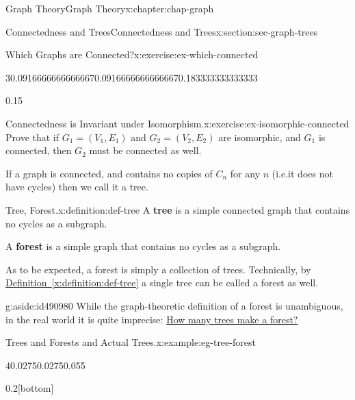 \documentclass[oneside,10pt,]{book}
\newcommand{\xreffont}{\relax}
\newcommand{\terminology}[1]{\textbf{#1}}
\numberwithin{equation}{section}
\begin{document}
\begin{chapterptx}{Graph Theory}{}{Graph Theory}{}{}{x:chapter:chap-graph}
\begin{sectionptx}{Connectedness and Trees}{}{Connectedness and Trees}{}{}{x:section:sec-graph-trees}
\begin{inlineexercise}{Which Graphs are Connected?}{x:exercise:ex-which-connected}
\begin{sidebyside}{3}{0.0916666666666667}{0.0916666666666667}{0.183333333333333}
\begin{sbspanel}{0.15}
{
}%
\end{sbspanel}%
\end{sidebyside}%
\end{inlineexercise}
\begin{inlineexercise}{Connectedness is Invariant under Isomorphism.}{x:exercise:ex-isomorphic-connected}%
Prove that if \(G_1 = (V_1,E_1)\) and \(G_2 = (V_2,E_2)\) are isomorphic, and \(G_1\) is connected, then \(G_2\) must be connected as well.%
\end{inlineexercise}
If a graph is connected, and contains no copies of \(C_n\) for any \(n\) (i.e.\@ it does not have cycles) then we call it a tree.%
\begin{definition}{Tree, Forest.}{x:definition:def-tree}%
A \terminology{tree} is a simple connected graph that contains no cycles as a subgraph.%
\par
A \terminology{forest} is a simple graph that contains no cycles as a subgraph.%
\end{definition}
As to be expected, a forest is simply a collection of trees. Technically, by \hyperref[x:definition:def-tree]{Definition~{\xreffont\ref{x:definition:def-tree}}} a single tree can be called a forest as well.%
\begin{aside}{}{g:aside:id490980}%
While the graph-theoretic definition of a forest is unambiguous, in the real world it is quite imprecise: \href{https://www.nature.org/en-us/what-we-do/our-insights/perspectives/how-many-trees-make-a-forest/}{How many trees make a forest?}%
\end{aside}
\begin{example}{Trees and Forests and Actual Trees.}{x:example:eg-tree-forest}%
\begin{sidebyside}{4}{0.0275}{0.0275}{0.055}%
\begin{sbspanel}{0.2}[bottom]%
\end{sbspanel}
\end{sidebyside}
\end{example}
\end{sectionptx}
\end{chapterptx}
\end{document}
